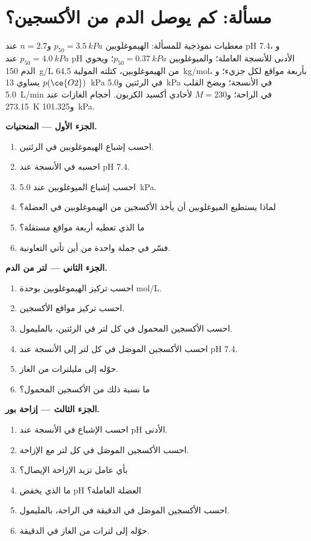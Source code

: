 \section{مسألة: كم يوصل الدم من الأكسجين؟}

\begin{problem}
\label{pb:b3:bioinorganic:1}
معطيات نموذجية للمسألة: الهيموغلوبين $p_{50} = \qty{3.5}{kPa}$ و$n = 2.7$ عند pH 7.4، و$p_{50} = \qty{4.0}{kPa}$ عند
pH الأدنى للأنسجة العاملة؛ والميوغلوبين $p_{50} = \qty{0.37}{kPa}$؛ ويحوي الدم \qty{150}{g/L} من
الهيموغلوبين، كتلته المولية \qty{64.5}{kg/mol}، بأربعة مواقع لكل جزيء؛ و$p(\ce{O2})$ يساوي \qty{13}{kPa}
في الرئتين و\qty{5.0}{kPa} في الأنسجة؛ ويضخ القلب \qty{5.0}{L/min} في الراحة؛
و$M = 230$ لأحادي أكسيد الكربون. أحجام الغازات عند \qty{273.15}{K} و\qty{101.325}{kPa}.

\medskip\noindent\textbf{الجزء الأول --- المنحنيات.}
\begin{enumerate}
  \item احسب إشباع الهيموغلوبين في الرئتين.
  \item احسبه في الأنسجة عند pH 7.4.
  \item احسب إشباع الميوغلوبين عند \qty{5.0}{kPa}.
  \item لماذا يستطيع الميوغلوبين أن يأخذ الأكسجين من الهيموغلوبين في العضلة؟
  \item ما  الذي تعطيه أربعة مواقع مستقلة؟
  \item فسّر في جملة واحدة من أين تأتي التعاونية.
\end{enumerate}

\medskip\noindent\textbf{الجزء الثاني --- لتر من الدم.}
\begin{enumerate}[resume]
  \item احسب تركيز الهيموغلوبين بوحدة mol/L.
  \item احسب تركيز مواقع الأكسجين.
  \item احسب الأكسجين المحمول في كل لتر في الرئتين، بالمليمول.
  \item احسب الأكسجين الموصَل في كل لتر إلى الأنسجة عند pH 7.4.
  \item حوّله إلى مليلترات من الغاز.
  \item ما نسبة ذلك من الأكسجين المحمول؟
\end{enumerate}

\medskip\noindent\textbf{الجزء الثالث --- إزاحة بور.}
\begin{enumerate}[resume]
  \item احسب الإشباع في الأنسجة عند pH الأدنى.
  \item احسب الأكسجين الموصَل في كل لتر مع الإزاحة.
  \item بأي عامل تزيد الإزاحة الإيصال؟
  \item ما الذي يخفض pH العضلة العاملة؟
  \item احسب الأكسجين الموصَل في الدقيقة في الراحة، بالمليمول.
  \item حوّله إلى لترات من الغاز في الدقيقة.
\end{enumerate}


\end{problem}
